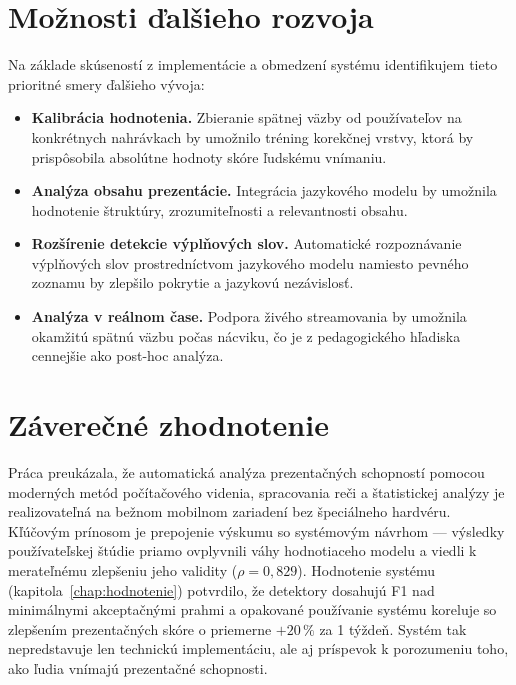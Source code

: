 \section{Možnosti ďalšieho rozvoja}

Na základe skúseností z implementácie a obmedzení systému identifikujem tieto prioritné smery ďalšieho vývoja:

\begin{itemize}
    \item \textbf{Kalibrácia hodnotenia.} Zbieranie spätnej väzby od používateľov na konkrétnych nahrávkach by umožnilo tréning korekčnej vrstvy, ktorá by prispôsobila absolútne hodnoty skóre ľudskému vnímaniu.
    \item \textbf{Analýza obsahu prezentácie.} Integrácia jazykového modelu by umožnila hodnotenie štruktúry, zrozumiteľnosti a relevantnosti obsahu.
    \item \textbf{Rozšírenie detekcie výplňových slov.} Automatické rozpoznávanie výplňových slov prostredníctvom jazykového modelu namiesto pevného zoznamu by zlepšilo pokrytie a jazykovú nezávislosť.
    \item \textbf{Analýza v reálnom čase.} Podpora živého streamovania by umožnila okamžitú spätnú väzbu počas nácviku, čo je z pedagogického hľadiska cennejšie ako post-hoc analýza.
\end{itemize}

\section{Záverečné zhodnotenie}

Práca preukázala, že automatická analýza prezentačných schopností pomocou moderných metód počítačového videnia, spracovania reči a štatistickej analýzy je realizovateľná na bežnom mobilnom zariadení bez špeciálneho hardvéru.
Kľúčovým prínosom je prepojenie výskumu so systémovým návrhom --- výsledky používateľskej štúdie priamo ovplyvnili váhy hodnotiaceho modelu a viedli k merateľnému zlepšeniu jeho validity ($\rho = 0{,}829$). Hodnotenie systému (kapitola~\ref{chap:hodnotenie}) potvrdilo, že detektory dosahujú F1 nad minimálnymi akceptačnými prahmi a opakované používanie systému koreluje so zlepšením prezentačných skóre o priemerne $+20\,\%$ za 1 týždeň. Systém tak nepredstavuje len technickú implementáciu, ale aj príspevok k porozumeniu toho, ako ľudia vnímajú prezentačné schopnosti.
